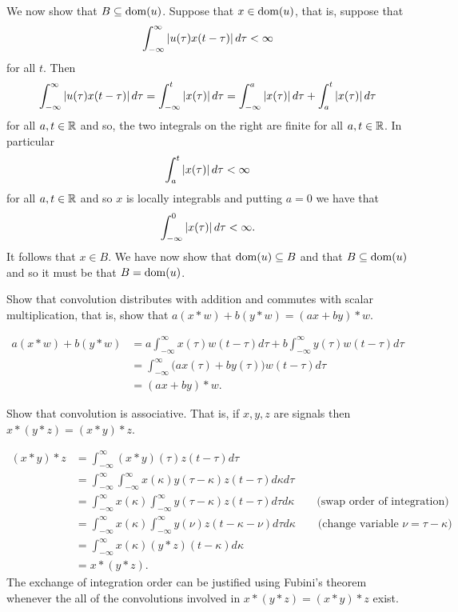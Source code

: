 \begin{excersizelist}
\begin{solution}
We now show that $B \subseteq \operatorname{dom}(u)$.  Suppose that $x \in \operatorname{dom}(u)$, that is, suppose that
\[
\int_{-\infty}^{\infty} \left\vert u(\tau) x(t - \tau) \right\vert d\tau < \infty
\]
for all $t$.  Then
\[
\int_{-\infty}^{\infty} \left\vert u(\tau) x(t - \tau) \right\vert d\tau = \int_{-\infty}^{t} \left\vert x(\tau) \right\vert d\tau = \int_{-\infty}^{a} \left\vert x(\tau) \right\vert d\tau + \int_{a}^{t} \left\vert x(\tau) \right\vert d\tau
\]
for all $a, t \in {\mathbb R}$ and so, the two integrals on the right are finite for all $a,t \in {\mathbb R}$.  In particular
\[
\int_{a}^{t} \left\vert x(\tau) \right\vert d\tau < \infty
\]
for all $a, t \in {\mathbb R}$ and so $x$ is locally integrabls and putting $a = 0$ we have that
\[
\int_{-\infty}^{0} \left\vert x(\tau) \right\vert d\tau < \infty.
\]
It follows that $x \in B$.  We have now show that $\operatorname{dom}(u) \subseteq B$ and that $B \subseteq \operatorname{dom}(u)$ and so it must be that $B = \operatorname{dom}(u)$.
\end{solution} 

\item \label{excer:distributivecommutive} Show that convolution distributes with addition and commutes with scalar multiplication, that is, show that $a(x*w) + b(y*w) = (ax+by)*w$.
\begin{solution}
\begin{align*}
a (x * w) + b (y * w) &= a \int_{-\infty}^{\infty} x(\tau) w(t - \tau) d\tau + b \int_{-\infty}^{\infty} y(\tau) w(t - \tau) d\tau \\
&= \int_{-\infty}^{\infty} \big(ax(\tau) + by(\tau)\big) w(t - \tau) d\tau\\
&= (ax + by) * w.
\end{align*}
\end{solution}

\item \label{excer:convassociative} Show that convolution is associative.  That is, if $x,y,z$ are signals then $x*(y*z) = (x*y)*z$. 
\begin{solution}
\begin{align*}
(x*y)*z &= \int_{-\infty}^\infty (x*y)(\tau) z(t - \tau) d\tau \\
&= \int_{-\infty}^\infty \int_{-\infty}^\infty x(\kappa) y(\tau-\kappa) z(t - \tau) d\kappa d\tau \\
&= \int_{-\infty}^\infty x(\kappa)  \int_{-\infty}^\infty y(\tau-\kappa) z(t - \tau)  d\tau d\kappa  \qquad \text{(swap order of integration)} \\
&= \int_{-\infty}^\infty x(\kappa)  \int_{-\infty}^\infty y(\nu) z(t - \kappa - \nu)  d\tau d\kappa  \qquad \text{(change variable $\nu = \tau-\kappa$)} \\
&= \int_{-\infty}^\infty x(\kappa)  (y * z)(t - \kappa) d\kappa \\
&= x*(y*z).
\end{align*}
The exchange of integration order can be justified using Fubini's theorem whenever the all of the convolutions involved in $x*(y*z) = (x*y)*z$ exist.
\end{solution}


\end{excersizelist}
